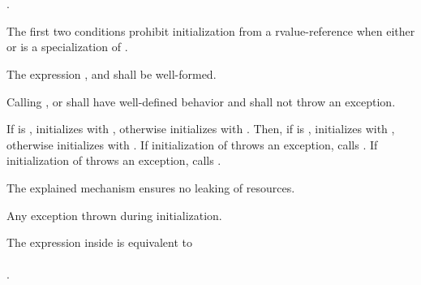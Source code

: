 \documentclass[ebook,11pt,article]{memoir}
\begin{document}
\begin{itemdescr}
\pnum
\constraints
{} \\
\\
.\\
\begin{note}
The first two conditions prohibit initialization from a rvalue-reference when either  or  is a specialization of .
\end{note}

\pnum
\mandates
The expression
,  and  shall be well-formed.

\pnum
\expects
Calling ,  or  shall have well-defined behavior and shall not throw an exception. 

\pnum
\effects 
If  is , initializes  with , otherwise initializes  with .
Then, if  is , initializes  with , otherwise initializes  with .
If initialization of  throws an exception, calls .  If initialization of  throws an exception, calls .
\begin{note}
The explained mechanism ensures no leaking of resources.
\end{note}

\pnum
\throws Any exception thrown during initialization.

\pnum
\remarks
The expression inside  is equivalent to \\
\\.

\end{itemdescr}
\end{document}
